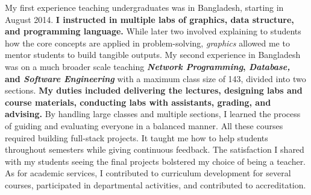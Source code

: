 \documentclass[10pt]{article}
\newcommand{\textcourse}[1]{\textit{#1}}
\begin{document}
My first experience teaching undergraduates was in Bangladesh, starting in August 2014. 
\textbf{I instructed in multiple labs of graphics, data structure, and programming language.} While later two involved explaining to students how the core concepts are applied in problem-solving, \textit{graphics} allowed me to mentor students to build tangible outputs. My second experience in Bangladesh was on a much broader scale 
teaching \textbf{\textcourse{Network Programming}, \textit{Database,} and \textit{Software Engineering}}
with a maximum class size of 143, divided into two sections. 
\textbf{My duties included delivering the lectures, designing labs and course materials, conducting labs with assistants, grading, and advising.}
By handling large classes and multiple sections, I learned the process of guiding and evaluating everyone in a balanced manner.
All these courses required building full-stack projects. It taught me how to help students throughout semesters while giving continuous feedback. The satisfaction I shared with my students seeing the final projects
bolstered my choice of being a teacher. As for academic services,
I contributed to curriculum development for several courses, participated in departmental activities, and
contributed to accreditation.
\end{document}
